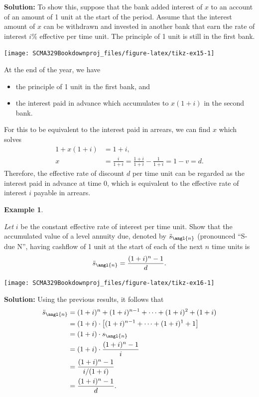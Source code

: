\documentclass[
]{book}
\theoremstyle{definition}
\theoremstyle{definition}
\newtheorem{example}{Example}[chapter]
\theoremstyle{definition}
\theoremstyle{definition}
\theoremstyle{remark}
\begin{document}
\textbf{Solution:} To show this, suppose that the bank added interest of \(x\)
to an account of an amount of 1 unit at the start of the period. Assume
that the interest amount of \(x\) can be withdrawn and invested in another
bank that earn the rate of interest \(i\%\) effective per time unit. The
principle of 1 unit is still in the first bank.

\begin{center}\texttt{[image: SCMA329Bookdownproj\_files/figure-latex/tikz-ex15-1]} \end{center}

At the end of the year, we have

\begin{itemize}
\item
  the principle of 1 unit in the first bank, and
\item
  the interest paid in advance which accumulates to \(x(1+i)\) in the
  second bank.
\end{itemize}

For this to be equivalent to the interest paid in arrears, we can find
\(x\) which solves \[\begin{aligned}
     1 + x(1+i) &= 1 + i,\\
     x &= \frac{i}{1+i} = \frac{1+i}{1+i} - \frac{1}{1+i}  = 1-v = d.\end{aligned}\]
Therefore, the effective rate of discount \(d\) per time unit can be
regarded as the interest paid in advance at time 0, which is equivalent
to the effective rate of interest \(i\) payable in arrears.

\begin{example}
\protect\hypertarget{exm:unlabeled-div-30}{}\label{exm:unlabeled-div-30}

\emph{Let} \(i\) be the constant effective rate of interest per time unit. Show
that the accumulated value of a level annuity due, denoted by
\(\ddot{s}_\angl{n}\) (pronounced ``S-due N'', having cashflow of 1 unit at
the start of each of the next \(n\) time units is
\[\ddot{s}_\angl{n} = \frac{(1+i)^n -1 }{d}.\]

\end{example}

\begin{center}\texttt{[image: SCMA329Bookdownproj\_files/figure-latex/tikz-ex16-1]} \end{center}

\textbf{Solution:} Using the previous results, it follows that
\[\begin{aligned}
 \ddot{s}_\angl{n} &= (1+i)^n + (1+i)^{n-1} + \cdots + (1+i)^2 + (1+i) \\
            &= (1+i) \cdot \left[(1+i)^{n-1} + \cdots + (1+i)^1 + 1\right] \\
            &= (1+i) \cdot {s}_\angl{n} \\
            &= (1+i) \cdot \frac{(1+i)^n -1 }{i}\\
            &=  \frac{(1+i)^n -1 }{i/(1+i)}\\
            &=  \frac{(1+i)^n -1 }{d}.\end{aligned}\]
\end{document}
